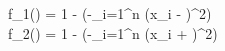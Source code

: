 f_1() = 1 - \exp\left(-\sum_{i=1}^n \left(x_i - \right)^2\right) \\
f_2() = 1 - \exp\left(-\sum_{i=1}^n \left(x_i + \right)^2\right)
